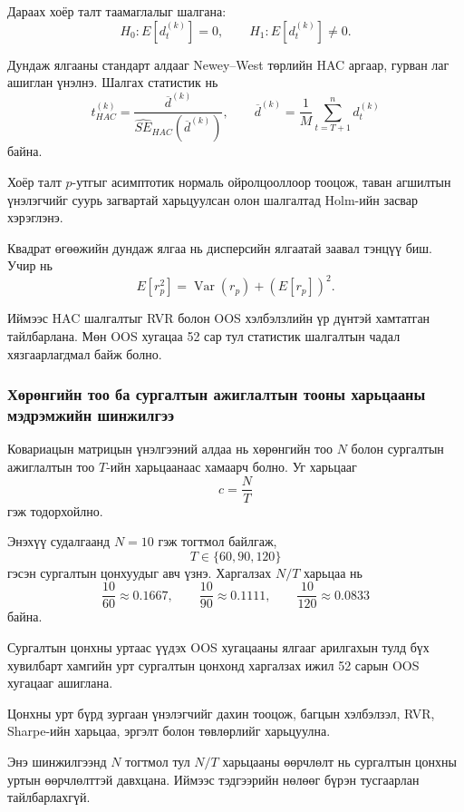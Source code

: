 Дараах хоёр талт таамаглалыг шалгана:
\[
H_0:E[d_t^{(k)}]=0,
\qquad
H_1:E[d_t^{(k)}]\neq 0.
\]

Дундаж ялгааны стандарт алдааг
Newey--West төрлийн HAC аргаар,
гурван лаг ашиглан үнэлнэ.
Шалгах статистик нь
\[
t_{HAC}^{(k)}
=
\frac{\overline{d}^{(k)}}
{\widehat{SE}_{HAC}
	(\overline{d}^{(k)})},
\qquad
\overline{d}^{(k)}
=
\frac{1}{M}
\sum_{t=T+1}^{n}d_t^{(k)}
\]
байна.

Хоёр талт $p$-утгыг асимптотик
нормаль ойролцооллоор тооцож,
таван агшилтын үнэлэгчийг суурь
загвартай харьцуулсан олон шалгалтад
Holm-ийн засвар хэрэглэнэ.

Квадрат өгөөжийн дундаж ялгаа нь
дисперсийн ялгаатай заавал тэнцүү биш.
Учир нь
\[
E[r_p^2]
=
\operatorname{Var}(r_p)
+
\left(E[r_p]\right)^2.
\]

Иймээс HAC шалгалтыг RVR болон
OOS хэлбэлзлийн үр дүнтэй хамтатган
тайлбарлана. Мөн OOS хугацаа
52 сар тул статистик шалгалтын
чадал хязгаарлагдмал байж болно.


\subsubsection{Хөрөнгийн тоо ба сургалтын
	ажиглалтын тооны харьцааны мэдрэмжийн шинжилгээ}
\label{subsubsec:nt_sensitivity}

Ковариацын матрицын үнэлгээний алдаа
нь хөрөнгийн тоо $N$ болон сургалтын
ажиглалтын тоо $T$-ийн харьцаанаас
хамаарч болно. Уг харьцааг
\[
c=\frac{N}{T}
\]
гэж тодорхойлно.

Энэхүү судалгаанд $N=10$ гэж
тогтмол байлгаж,
\[
T\in\{60,90,120\}
\]
гэсэн сургалтын цонхуудыг авч үзнэ.
Харгалзах $N/T$ харьцаа нь
\[
\frac{10}{60}\approx0.1667,\qquad
\frac{10}{90}\approx0.1111,\qquad
\frac{10}{120}\approx0.0833
\]
байна.

Сургалтын цонхны уртаас үүдэх
OOS хугацааны ялгааг арилгахын
тулд бүх хувилбарт хамгийн урт
сургалтын цонхонд харгалзах
ижил 52 сарын OOS хугацааг ашиглана.

Цонхны урт бүрд зургаан үнэлэгчийг
дахин тооцож, багцын хэлбэлзэл,
RVR, Sharpe-ийн харьцаа, эргэлт
болон төвлөрлийг харьцуулна.

Энэ шинжилгээнд $N$ тогтмол тул
$N/T$ харьцааны өөрчлөлт нь сургалтын
цонхны уртын өөрчлөлттэй давхцана.
Иймээс тэдгээрийн нөлөөг бүрэн
тусгаарлан тайлбарлахгүй.

